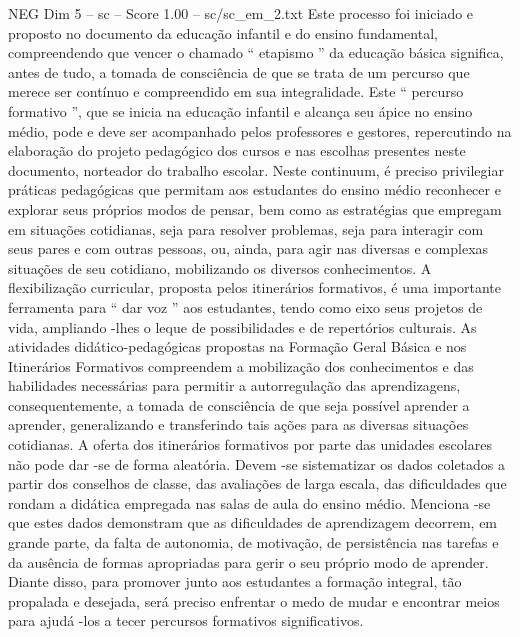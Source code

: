 \begin{textsample}{NEG Dim 5 – sc – Score 1.00 – sc/sc\_em\_2.txt}
Este processo foi iniciado e proposto no documento da educação infantil e do ensino fundamental, compreendendo que vencer o chamado “ etapismo ” da educação básica significa, antes de tudo, a tomada de consciência de que se trata de um percurso que merece ser contínuo e compreendido em sua integralidade.
Este “ percurso formativo ”, que se inicia na educação infantil e alcança seu ápice no ensino médio, pode e deve ser acompanhado pelos professores e gestores, repercutindo na elaboração do projeto pedagógico dos cursos e nas escolhas presentes neste documento, norteador do trabalho escolar.
Neste continuum, é preciso privilegiar práticas pedagógicas que permitam aos estudantes do ensino médio reconhecer e explorar seus próprios modos de pensar, bem como as estratégias que empregam em situações cotidianas, seja para resolver problemas, seja para interagir com seus pares e com outras pessoas, ou, ainda, para agir nas diversas e complexas situações de seu cotidiano, mobilizando os diversos conhecimentos.
A flexibilização curricular, proposta pelos itinerários formativos, é uma importante ferramenta para “ dar voz ” aos estudantes, tendo como eixo seus projetos de vida, ampliando -lhes o leque de possibilidades e de repertórios culturais.
As atividades didático-pedagógicas propostas na Formação Geral Básica e nos Itinerários Formativos compreendem a mobilização dos conhecimentos e das habilidades necessárias para permitir a autorregulação das aprendizagens, consequentemente, a tomada de consciência de que seja possível aprender a aprender, generalizando e transferindo tais ações para as diversas situações cotidianas.
A oferta dos itinerários formativos por parte das unidades escolares não pode dar -se de forma aleatória.
Devem -se sistematizar os dados coletados a partir dos conselhos de classe, das avaliações de larga escala, das dificuldades que rondam a didática empregada nas salas de aula do ensino médio.
Menciona -se que estes dados demonstram que as dificuldades de aprendizagem decorrem, em grande parte, da falta de autonomia, de motivação, de persistência nas tarefas e da ausência de formas apropriadas para gerir o seu próprio modo de aprender.
Diante disso, para promover junto aos estudantes a formação integral, tão propalada e desejada, será preciso enfrentar o medo de mudar e encontrar meios para ajudá -los a tecer percursos formativos significativos.

\end{textsample}
